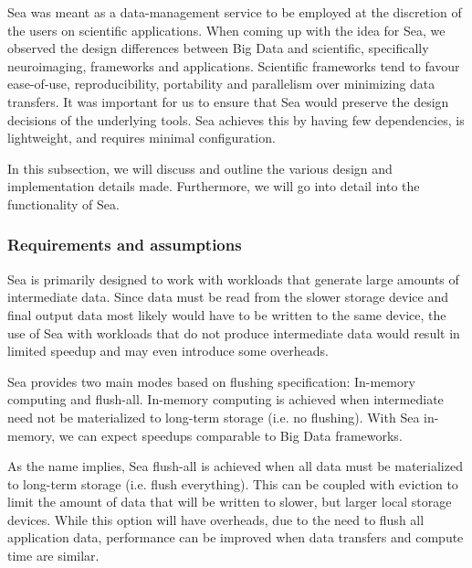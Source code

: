 \documentclass[10pt,journal,compsoc]{IEEEtran}
\begin{document}
Sea was meant as a data-management service to be employed at the discretion of
the users on scientific applications. When coming up with the idea for Sea, we
observed the design differences between Big Data and scientific, specifically
neuroimaging, frameworks and applications. Scientific frameworks tend to favour
ease-of-use, reproducibility, portability and parallelism over minimizing data
transfers. It was important for us to ensure that Sea would preserve the design
decisions of the underlying tools. Sea achieves this by having few dependencies,
is lightweight, and requires minimal configuration.


In this subsection, we will discuss and outline the various design and
implementation details made. Furthermore, we will go into detail into the
functionality of Sea.

\subsubsection{Requirements and assumptions}

Sea is primarily designed to work with workloads that generate large amounts of
intermediate data. Since data must be read from the slower storage device and
final output data most likely would have to be written to the same device, the
use of Sea with workloads that do not produce intermediate data would result in
limited speedup and may even introduce some overheads. 

Sea provides two main modes based on flushing specification: In-memory computing
and flush-all. In-memory computing is achieved when intermediate need not be
materialized to long-term storage (i.e. no flushing). With Sea in-memory, we can
expect speedups comparable to Big Data frameworks.

As the name implies, Sea flush-all is achieved when all data must be
materialized to long-term storage (i.e. flush everything). This can be coupled
with eviction to limit the amount of data that will be written to slower, but
larger local storage devices. While this option will have overheads, due to the
need to flush all application data, performance can be improved when data
transfers and compute time are similar. 

\end{document}
